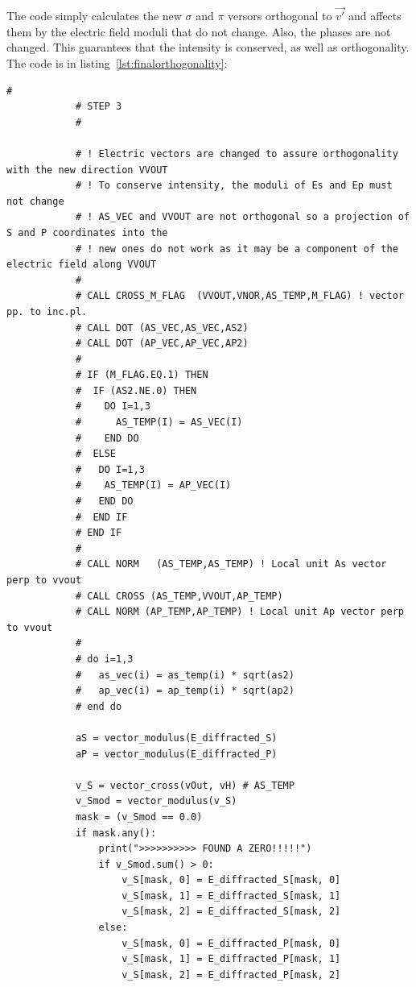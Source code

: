 \documentclass{iucr}
\newcommand{\todo}[1]{{\color{red}[TODO: "#1'']}}
\begin{document}


The code simply calculates the new $\sigma$ and $\pi$ versors orthogonal to $\vec{v'}$ and affects them by the electric field moduli that do not change. 
Also, the phases are not changed. 
This guarantees that the intensity is conserved, as well as orthogonality.
The code is in listing~\ref{lst:finalorthogonality}: 



\begin{lstlisting}[caption={\todo{CORRECT!!} Code to guarantee that the local $\sigma$ and $\pi$ electric fields hold the orthogonality relationships.}, label={lst:finalorthogonality}, captionpos=b]
            #
            # STEP 3
            #

            # ! Electric vectors are changed to assure orthogonality with the new direction VVOUT
            # ! To conserve intensity, the moduli of Es and Ep must not change
            # ! AS_VEC and VVOUT are not orthogonal so a projection of S and P coordinates into the
            # ! new ones do not work as it may be a component of the electric field along VVOUT
            #
            # CALL CROSS_M_FLAG  (VVOUT,VNOR,AS_TEMP,M_FLAG) ! vector pp. to inc.pl.
            # CALL DOT (AS_VEC,AS_VEC,AS2)
            # CALL DOT (AP_VEC,AP_VEC,AP2)
            #
            # IF (M_FLAG.EQ.1) THEN
            #  IF (AS2.NE.0) THEN
            #    DO I=1,3
            #      AS_TEMP(I) = AS_VEC(I)
            #    END DO
            #  ELSE
            #   DO I=1,3
            #    AS_TEMP(I) = AP_VEC(I)
            #   END DO
            #  END IF
            # END IF
            #
            # CALL NORM   (AS_TEMP,AS_TEMP) ! Local unit As vector perp to vvout
            # CALL CROSS (AS_TEMP,VVOUT,AP_TEMP)
            # CALL NORM (AP_TEMP,AP_TEMP) ! Local unit Ap vector perp to vvout
            #
            # do i=1,3
            #   as_vec(i) = as_temp(i) * sqrt(as2)
            #   ap_vec(i) = ap_temp(i) * sqrt(ap2)
            # end do

            aS = vector_modulus(E_diffracted_S)
            aP = vector_modulus(E_diffracted_P)

            v_S = vector_cross(vOut, vH) # AS_TEMP
            v_Smod = vector_modulus(v_S)
            mask = (v_Smod == 0.0)
            if mask.any():
                print(">>>>>>>>>> FOUND A ZERO!!!!!")
                if v_Smod.sum() > 0:
                    v_S[mask, 0] = E_diffracted_S[mask, 0]
                    v_S[mask, 1] = E_diffracted_S[mask, 1]
                    v_S[mask, 2] = E_diffracted_S[mask, 2]
                else:
                    v_S[mask, 0] = E_diffracted_P[mask, 0]
                    v_S[mask, 1] = E_diffracted_P[mask, 1]
                    v_S[mask, 2] = E_diffracted_P[mask, 2]


\end{lstlisting}
\end{document}

